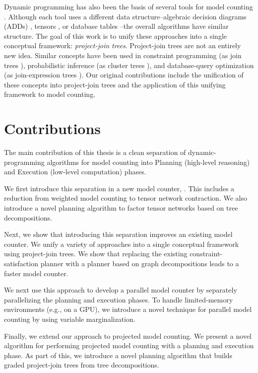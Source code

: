 Dynamic programming has also been the basis of several tools for model counting \cite{DPV20,DDV19,dudek2020parallel,fichte2020exploiting}.
Although each tool uses a different data structure--algebraic decision diagrams (ADDs) \cite{DPV20}, tensors \cite{DDV19,dudek2020parallel}, or database tables \cite{fichte2020exploiting}--the overall algorithms have similar structure.
The goal of this work is to unify these approaches into a single conceptual framework: \emph{project-join trees}.
Project-join trees are not an entirely new idea.
Similar concepts have been used in constraint programming (as join trees \cite{dechter1989tree}), probabilistic inference (as cluster trees \cite{SAS94}), and database-query optimization (as join-expression trees \cite{MPPV04}).
Our original contributions include the unification of these concepts into project-join trees and the application of this unifying framework to model counting.

\section{Contributions}
The main contribution of this thesis is a clean separation of dynamic-programming algorithms for model counting into
Planning (high-level reasoning) and Execution (low-level computation) phases.

We first introduce this separation in a new model counter, . This includes a reduction from weighted model counting to tensor network contraction. We also introduce a novel planning algorithm to factor tensor networks based on tree decompositions.

Next, we show that introducing this separation improves an existing model counter. We unify a variety of approaches into a single conceptual framework using project-join trees. We show that replacing the existing constraint-satisfaction planner with a planner based on graph decompositions leads to a faster model counter.

We next use this approach to develop a parallel model counter by separately parallelizing the planning and execution phases. To handle limited-memory environments (e.g., on a GPU), we introduce a novel technique for parallel model counting by using variable marginalization.

Finally, we extend our approach to projected model counting. We present a novel algorithm for performing projected model counting with a planning and execution phase. As part of this, we introduce a novel planning algorithm that builds graded project-join trees from tree decompositions.

